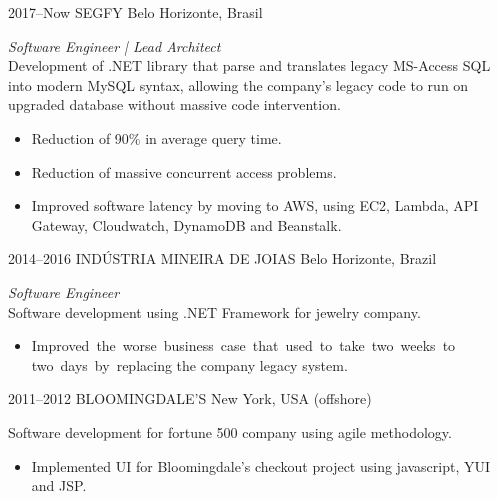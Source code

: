 \documentclass[]{friggeri-cv-a4}
\begin{document}
\begin{entrylist}

\entry
{2017--Now}
{SEGFY}
{Belo Horizonte, Brasil}
{\emph{Software Engineer | Lead Architect} \\

Development of .NET library that parse and translates legacy MS-Access SQL into modern MySQL syntax, allowing the company's legacy code to run on upgraded database without massive code intervention.
\begin{itemize}
    \item Reduction of 90\% in average query time.
    \item Reduction of massive concurrent access problems.
    \item Improved software latency by moving to AWS, using EC2, Lambda, API Gateway, Cloudwatch, DynamoDB and Beanstalk.
\end{itemize}}

\entry
{2014--2016}
{INDÚSTRIA MINEIRA DE JOIAS}
{Belo Horizonte, Brazil}
{\emph{Software Engineer} \\

Software development using .NET Framework for jewelry company.
\begin{itemize}
    \item Improved the worse business case that used to take two weeks to 
two days by replacing the company legacy system. 
\end{itemize}
}



\entry
{2011--2012}
{BLOOMINGDALE'S}
{New York, USA (offshore)}
{Software development for fortune 500 company using agile methodology.
\begin{itemize}
    \item Implemented UI for Bloomingdale's checkout project using javascript, YUI and JSP.
\end{itemize}
}


\end{entrylist}
\end{document}
